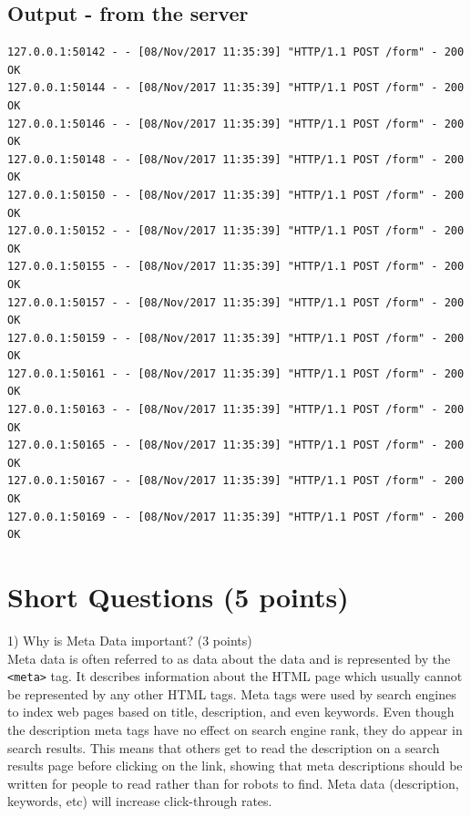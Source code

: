 \documentclass{WeSTassignment}
\begin{document}
\subsection*{Output - from the server}
\begin{verbatim}
127.0.0.1:50142 - - [08/Nov/2017 11:35:39] "HTTP/1.1 POST /form" - 200 OK
127.0.0.1:50144 - - [08/Nov/2017 11:35:39] "HTTP/1.1 POST /form" - 200 OK
127.0.0.1:50146 - - [08/Nov/2017 11:35:39] "HTTP/1.1 POST /form" - 200 OK
127.0.0.1:50148 - - [08/Nov/2017 11:35:39] "HTTP/1.1 POST /form" - 200 OK
127.0.0.1:50150 - - [08/Nov/2017 11:35:39] "HTTP/1.1 POST /form" - 200 OK
127.0.0.1:50152 - - [08/Nov/2017 11:35:39] "HTTP/1.1 POST /form" - 200 OK
127.0.0.1:50155 - - [08/Nov/2017 11:35:39] "HTTP/1.1 POST /form" - 200 OK
127.0.0.1:50157 - - [08/Nov/2017 11:35:39] "HTTP/1.1 POST /form" - 200 OK
127.0.0.1:50159 - - [08/Nov/2017 11:35:39] "HTTP/1.1 POST /form" - 200 OK
127.0.0.1:50161 - - [08/Nov/2017 11:35:39] "HTTP/1.1 POST /form" - 200 OK
127.0.0.1:50163 - - [08/Nov/2017 11:35:39] "HTTP/1.1 POST /form" - 200 OK
127.0.0.1:50165 - - [08/Nov/2017 11:35:39] "HTTP/1.1 POST /form" - 200 OK
127.0.0.1:50167 - - [08/Nov/2017 11:35:39] "HTTP/1.1 POST /form" - 200 OK
127.0.0.1:50169 - - [08/Nov/2017 11:35:39] "HTTP/1.1 POST /form" - 200 OK
\end{verbatim}


\section{Short Questions (5 points)}
1) Why is Meta Data important? (3 points)\\ 
Meta data is often referred to as data about the data and is represented by the \texttt{<meta>} tag. It describes information about the HTML page which usually cannot be represented by any other HTML tags. Meta tags were used by search engines to index web pages based on title, description, and even keywords. Even though the description meta tags have no effect on search engine rank, they do appear in search results. This means that others get to read the description on a search results page before clicking on the link, showing that meta descriptions should be written for people to read rather than for robots to find. Meta data (description, keywords, etc) will increase click-through rates.\\
\end{document}
